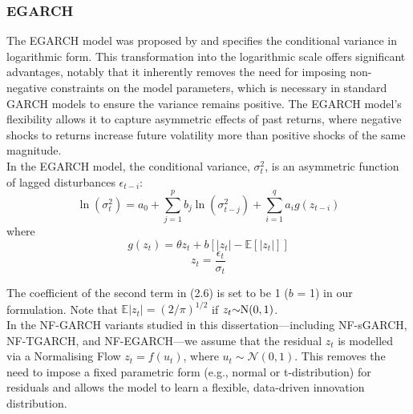 \documentclass[oneside,12pt]{CUEDthesisPSnPDF}
\newcommand{\E}{\mathbb{E}}
\newcommand{\textcite}{\citet}
\begin{document}
\subsubsection{EGARCH}
\noindent 
The EGARCH model was proposed by \textcite{nelson1991conditional} and specifies the conditional variance in logarithmic form. This transformation into the logarithmic scale offers significant advantages, notably that it inherently removes the need for imposing non-negative constraints on the model parameters, which is necessary in standard GARCH models to ensure the variance remains positive. The EGARCH model's flexibility allows it to capture asymmetric effects of past returns, where negative shocks to returns increase future volatility more than positive shocks of the same magnitude.\\

In the EGARCH model, the conditional variance, \(\sigma_t^2\), is an asymmetric function of lagged disturbances \(\epsilon_{t-i}\):\\

\begin{equation}
{\ln}(\sigma_t^2) =     
        a_0 +
        \sum_{j=1}^p b_j {\ln}(\sigma_{t-j}^2) +
        \sum_{i=1}^q a_i g( z_{t-i}) 
\end{equation}
where
\[
g(z_{t}) = {\theta} z_{t} + 
            {b [{| z_{t}|} - 
            \E[| z_{t}|]]}
\]
\vspace{8pt}
\[
z_{t} = \frac{\epsilon_{t}}{\sigma_{t}}
\]

The coefficient of the second term in (2.6) is set to be 1 (\(b\) = 1) in our formulation. Note that \({\E{|z_{t}|} = (2 / {\pi}) ^{1/2}} \) if \({z_{t} {\sim} \rm{N}(0,1)}\).\\

In the NF-GARCH variants studied in this dissertation—including NF-sGARCH, NF-TGARCH, and NF-EGARCH—we assume that the residual \( z_t \) is modelled via a Normalising Flow \( z_t = f(u_t) \), where \( u_t \sim \mathcal{N}(0,1) \). This removes the need to impose a fixed parametric form (e.g., normal or t-distribution) for residuals and allows the model to learn a flexible, data-driven innovation distribution.\\
\end{document}
